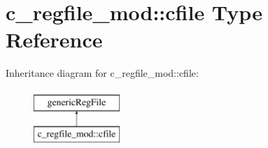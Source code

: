 \hypertarget{structc__regfile__mod_1_1cfile}{}\section{c\+\_\+regfile\+\_\+mod\+:\+:cfile Type Reference}
\label{structc__regfile__mod_1_1cfile}
Inheritance diagram for c\+\_\+regfile\+\_\+mod\+:\+:cfile\+:\begin{figure}[H]
\begin{center}
\leavevmode
\includegraphics[height=2.000000cm]{structc__regfile__mod_1_1cfile}
\end{center}
\end{figure}
